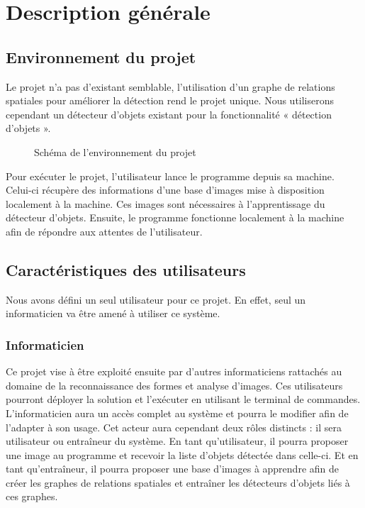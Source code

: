 \documentclass[debug,nodate,hideweeklyreports,noposter]{polytech/polytech}
\begin{document}
\chapter{Description générale}

\section{Environnement du projet}

Le projet n’a pas d’existant semblable, l’utilisation d’un graphe de relations spatiales pour améliorer la détection rend le projet unique. Nous utiliserons cependant un détecteur d’objets existant pour la fonctionnalité « détection d’objets ». 

\begin{figure}[H]
  \caption{Schéma de l'environnement du projet}
  \label{fig:envirproj}
\end{figure}

Pour exécuter le projet, l’utilisateur lance le programme depuis sa machine. Celui-ci récupère des informations d’une base d’images mise à disposition localement à la machine. Ces images sont nécessaires à l’apprentissage du détecteur d’objets. Ensuite, le programme fonctionne localement à la machine afin de répondre aux attentes de l’utilisateur. 

\section{Caractéristiques des utilisateurs}

Nous avons défini un seul utilisateur pour ce projet. En effet, seul un informaticien va être amené à utiliser ce système.

\subsection{Informaticien}

Ce projet vise à être exploité ensuite par d’autres informaticiens rattachés au domaine de la reconnaissance des formes et analyse d’images. Ces utilisateurs pourront déployer la solution et l’exécuter en utilisant le terminal de commandes.
L’informaticien aura un accès complet au système et pourra le modifier afin de l’adapter à son usage. 
Cet acteur aura cependant deux rôles distincts : il sera utilisateur ou entraîneur du système.
En tant qu’utilisateur, il pourra proposer une image au programme et recevoir la liste d’objets détectée dans celle-ci. Et en tant qu’entraîneur, il pourra proposer une base d’images à apprendre afin de créer les graphes de relations spatiales et entraîner les détecteurs d’objets liés à ces graphes.
\end{document}

